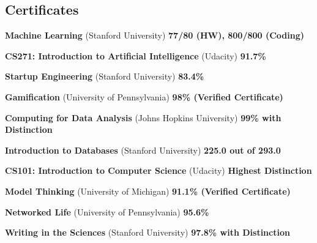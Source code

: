 \documentclass[overlapped,centered]{resume}
\begin{document}
\begin{resume}
    \section{\mysidestyle Certificates}

    \begin{list2}
	\item \textbf{Machine Learning} (Stanford University) \hspace{38mm} \textbf{77/80 (HW), 800/800 (Coding)}
	
	\item \textbf{CS271: Introduction to Artificial Intelligence} (Udacity) \hspace{52mm} \textbf{91.7\%}
	
	\item \textbf{Startup Engineering} (Stanford University) \hspace{78mm} \textbf{83.4\%}
	
    \item \textbf{Gamification} (University of Pennsylvania) \hspace{47mm} \textbf{98\% (Verified Certificate)}
	
	\item \textbf{Computing for Data Analysis} (Johns Hopkins University) \hspace{28mm} \textbf{99\% with Distinction}

	\item \textbf{Introduction to Databases} (Stanford University) \hspace{46mm} \textbf{225.0 out of 293.0}

	\item \textbf{CS101: Introduction to Computer Science} (Udacity) \hspace{34mm} \textbf{Highest Distinction}
	
    \item \textbf{Model Thinking} (University of Michigan) \hspace{44mm} \textbf{91.1\% (Verified Certificate)}

	\item \textbf{Networked Life} (University of Pennsylvania) \hspace{77mm} \textbf{95.6\%}

	\item \textbf{Writing in the Sciences} (Stanford University) \hspace{45mm} \textbf{97.8\% with Distinction}
	\end{list2}


\end{resume}
\end{document}
